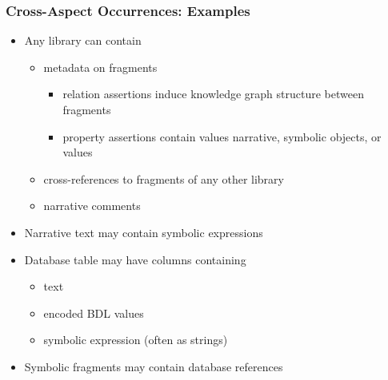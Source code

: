 \begin{frame}\frametitle{Cross-Aspect Occurrences: Examples}
\begin{itemize}
\item Any library can contain
\begin{itemize}
 \item metadata on fragments
  \begin{itemize}
  \item relation assertions induce knowledge graph structure between fragments
  \item property assertions contain values narrative, symbolic objects, or values
 \end{itemize}
 \item cross-references to fragments of any other library
 \item narrative comments
\end{itemize}
\item Narrative text may contain symbolic expressions 
\item Database table may have columns containing
 \begin{itemize}
 \item text
 \item encoded BDL values
 \item symbolic expression (often as strings)
 \end{itemize}
\item Symbolic fragments may contain database references
\end{itemize}
\end{frame}

